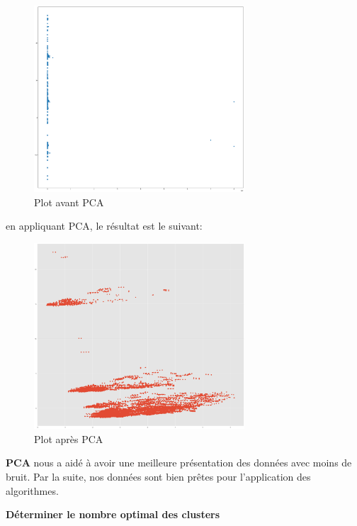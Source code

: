 \documentclass[12pt]{article}
\begin{document}
{\begin{figure}[H]
	\centering
    \includegraphics[width=0.7\textwidth]{image32.png}
     \caption{ Plot avant PCA}
    \label{fig:32}
\end{figure}

en appliquant PCA, le résultat est le suivant:

\begin{figure}[H]
	\centering
    \includegraphics[width=0.7\textwidth]{image33.png}
     \caption{ Plot après PCA}
    \label{fig:33}
\end{figure}

{\bf PCA} nous a  aidé à avoir une meilleure présentation des données avec moins de bruit.
Par la suite, nos données sont bien prêtes pour l’application des algorithmes.

{\bf Déterminer le nombre optimal des clusters}

}
\end{document}
